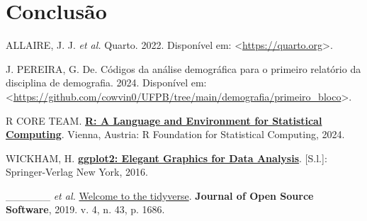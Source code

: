 \documentclass[
  12pt,
  letterpaper,
  DIV=11,
  numbers=noendperiod]{scrreprt}
\newlength{\cslhangindent}
\newenvironment{CSLReferences}[2] %
 {\begin{list}{}{%
  \setlength{\itemindent}{0pt}
  \setlength{\leftmargin}{0pt}
  \setlength{\parsep}{0pt}
  \ifodd #1
   \setlength{\leftmargin}{\cslhangindent}
   \setlength{\itemindent}{-1\cslhangindent}
  \fi
  \setlength{\itemsep}{#2\baselineskip}}}
 {\end{list}}
\begin{document}
\chapter*{Conclusão}\label{conclusuxe3o}

\label{refs}
\begin{CSLReferences}{0}{1}
ALLAIRE, J. J. \emph{et al.} Quarto. 2022. Disponível em:
\textless{}\url{https://quarto.org}\textgreater.

J. PEREIRA, G. De. Códigos da análise demográfica para o primeiro
relatório da disciplina de demografia. 2024. Disponível em:
\textless{}\url{https://github.com/cowvin0/UFPB/tree/main/demografia/primeiro_bloco}\textgreater.

R CORE TEAM. \textbf{\href{https://www.R-project.org/}{R: A Language and
Environment for Statistical Computing}}. Vienna, Austria: R Foundation
for Statistical Computing, 2024.

WICKHAM, H. \textbf{\href{https://ggplot2.tidyverse.org}{ggplot2:
Elegant Graphics for Data Analysis}}. {[}S.l.{]}: Springer-Verlag New
York, 2016.

\_\_\_\_\_\_ \emph{et al.}
\href{https://doi.org/10.21105/joss.01686}{Welcome to the tidyverse}.
\textbf{Journal of Open Source Software}, 2019. v. 4, n. 43, p. 1686.

\end{CSLReferences}
\end{document}
